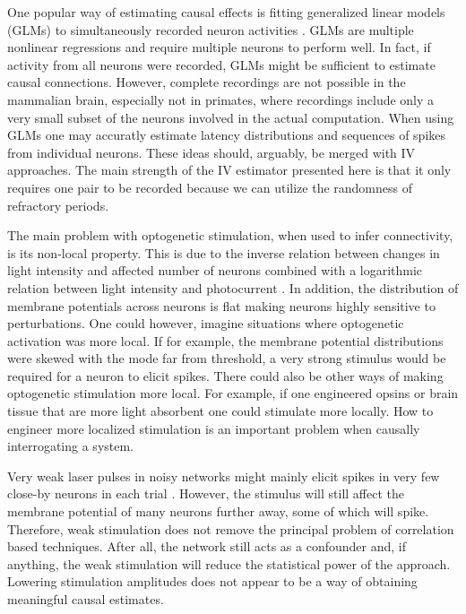 \documentclass[11pt]{article}
\begin{document}
One popular way of estimating causal effects is fitting generalized linear models (GLMs) to simultaneously recorded neuron activities \citep{pillow2008spatio, roudi2009ising}. 
GLMs are multiple nonlinear regressions and require multiple neurons to perform well. 
In fact, if activity from all neurons were recorded, GLMs might be sufficient to estimate causal connections. 
However, complete recordings are not possible in the mammalian brain, especially not in primates, where recordings include only a very small subset of the neurons involved in the actual computation. 
When using GLMs one may accuratly estimate latency distributions and sequences of spikes from individual neurons. 
These ideas should, arguably, be merged with IV approaches. 
The main strength of the IV estimator presented here is that it only requires one pair to be recorded because we can utilize the randomness of refractory periods. 

The main problem with optogenetic stimulation, when used to infer connectivity, is its non-local property. 
This is due to the inverse relation between changes in light intensity and affected number of neurons combined with a logarithmic relation between light intensity and photocurrent \cite{wang2007high}. 
In addition, the distribution of membrane potentials across neurons is flat \citep{destexhe1999impact,rudolph2006use,pare1998impact} making neurons highly sensitive to perturbations. 
One could however, imagine situations where optogenetic activation was more local. 
If for example, the membrane potential distributions were skewed with the mode far from threshold, a very strong stimulus would be required for a neuron to elicit spikes. 
There could also be other ways of making optogenetic stimulation more local. 
For example, if one engineered opsins or brain tissue that are more light absorbent one could stimulate more locally. 
How to engineer more localized stimulation is an important problem when causally interrogating a system.

Very weak laser pulses in noisy networks might mainly elicit spikes in very few close-by neurons in each trial \citep{English2017}. 
However, the stimulus will still affect the membrane potential of many neurons further away, some of which will spike. 
Therefore, weak stimulation does not remove the principal problem of correlation based techniques. 
After all, the network still acts as a confounder and, if anything, the weak stimulation will reduce the statistical power of the approach. 
Lowering stimulation amplitudes does not appear to be a way of obtaining meaningful causal estimates.
\end{document}
